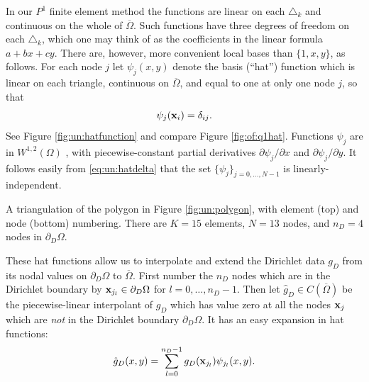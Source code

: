In our $P^1$ finite element method the functions are linear on each $\triangle_k$ and continuous on the whole of $\overline\Omega$.  Such functions have three degrees of freedom on each $\triangle_k$, which one may think of as the coefficients in the linear formula $a + b x + c y$.  There are, however, more convenient local bases than $\{1,x,y\}$, as follows.  For each node $j$ let $\psi_j(x,y)$ denote the basis (``hat'') function which is linear on each triangle, continuous on $\overline{\Omega}$, and equal to one at only one node $j$, so that
\begin{equation}
\psi_j(\mathbf{x}_i) = \delta_{ij}.  \label{eq:un:hatdelta}
\end{equation}
See Figure \ref{fig:un:hatfunction} and compare Figure \ref{fig:of:q1hat}.  Functions $\psi_j$ are in $W^{1,2}(\Omega)$ \citep{Braess2007}, with piecewise-constant partial derivatives $\partial\psi_j/\partial x$ and $\partial\psi_j/\partial y$.  It follows easily from \eqref{eq:un:hatdelta} that the set $\{\psi_j\}_{j=0,\dots,N-1}$ is linearly-independent.

\begin{marginfigure}


\medskip


\caption{A triangulation of the polygon in Figure \ref{fig:un:polygon}, with element (top) and node (bottom) numbering.  There are $K=15$ elements, $N=13$ nodes, and $n_D=4$ nodes in $\partial_D\Omega$.}
\label{fig:un:number-mesh}
\end{marginfigure}

These hat functions allow us to interpolate and extend the Dirichlet data $g_D$ from its nodal values on $\partial_D \Omega$ to $\overline\Omega$.  First number the $n_D$ nodes which are in the Dirichlet boundary by $\mathbf{x}_{j_l} \in \partial_D\Omega$ for $l=0,\dots,n_D-1$.  Then let $\hat g_D \in C(\overline\Omega)$ be the piecewise-linear interpolant of $g_D$ which has value zero at all the nodes $\mathbf{x}_j$ which are \emph{not} in the Dirichlet boundary $\partial_D \Omega$.  It has an easy expansion in hat functions:
\begin{equation}
\hat g_D(x,y) = \sum_{l=0}^{n_D-1} g_D(\mathbf{x}_{j_l}) \psi_{j_l}(x,y). \label{eq:un:hatgdefine}
\end{equation}

